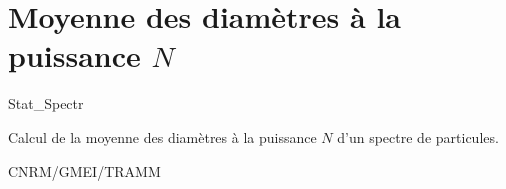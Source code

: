 %
\section{Moyenne des diam\`etres \`a la puissance $N$}

 {\sf Stat\_Spectr}


Calcul de la moyenne des diam\`etres \`a la puissance $N$
d'un spectre de particules.

\bigskip





CNRM/GMEI/TRAMM

